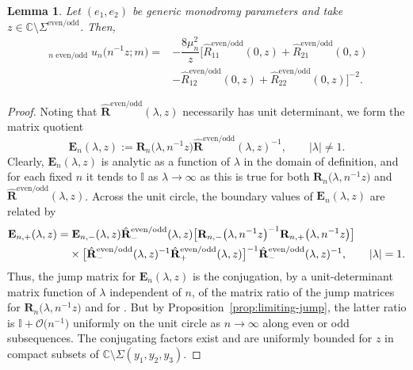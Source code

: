 \documentclass[pdftex]{sigma}
\numberwithin{equation}{section}
\newtheorem{Lemma}[Theorem]{Lemma}
\newcommand{\C}{{\mathbb{C}}}
\begin{document}
\begin{Lemma}
\label{lemma:limit}
Let $(e_1, e_2)$ be generic monodromy parameters and take $z \in \C \setminus \Sigma^\mathrm{even/odd}$. Then,
\begin{align}
 \mathop{\lim_{n\to\infty}}_{\text{$n$ even/odd}}u_n\big(n^{-1}z;m\big)={}&-\dfrac{8 \mu_n^2}{z}\big[\hat{R}_{11}^\mathrm{even/odd}(0,z)+\hat{R}_{21}^\mathrm{even/odd}(0,z)\nonumber\\
 &-\hat{R}_{12}^\mathrm{even/odd}(0,z)+\hat{R}_{22}^\mathrm{even/odd}(0,z)\big]^{-2}.\label{eq:un-Rhat}
\end{align}
\end{Lemma}
\begin{proof}

Noting that $\hat{\mathbf{R}}^\mathrm{even/odd}(\lambda,z)$ necessarily has unit determinant, we form the matrix quotient
\begin{equation*}
 \mathbf{E}_n(\lambda,z):=\mathbf{R}_n\big(\lambda,n^{-1}z\big)\hat{\mathbf{R}}^\mathrm{even/odd}(\lambda,z)^{-1},\qquad |\lambda|\neq 1.
\end{equation*}
Clearly, $\mathbf{E}_n(\lambda,z)$ is analytic as a function of $\lambda$ in the domain of definition, and for each fixed $n$ it tends to $\mathbb{I}$ as $\lambda\to\infty$ as this is true for both $\mathbf{R}_n\big(\lambda,n^{-1}z\big)$ and $\hat{\mathbf{R}}^\mathrm{even/odd}(\lambda,z)$. Across the unit circle, the boundary values of $\mathbf{E}_n(\lambda,z)$ are related by
\begin{align*}
 &\mathbf{E}_{n,+}(\lambda,z)= \mathbf{E}_{n,-}(\lambda,z)\hat{\mathbf{R}}_-^\mathrm{even/odd}(\lambda,z)\big[\mathbf{R}_{n,-}\big(\lambda,n^{-1}z\big)^{-1}\mathbf{R}_{n,+}\big(\lambda,n^{-1}z\big)\big]\\
 &\hphantom{\mathbf{E}_{n,+}(\lambda,z)=}{}
 \times \big[\hat{\mathbf{R}}^\mathrm{even/odd}_-(\lambda,z)^{-1}\hat{\mathbf{R}}^\mathrm{even/odd}_+(\lambda,z)\big]^{-1}
 \hat{\mathbf{R}}^\mathrm{even/odd}_-(\lambda,z)^{-1},\qquad |\lambda|=1.
\end{align*}
Thus, the jump matrix for $\mathbf{E}_n(\lambda,z)$ is the conjugation, by a unit-determinant matrix function of $\lambda$ independent of $n$, of the matrix ratio of the jump matrices for $\mathbf{R}_n\big(\lambda,n^{-1}z\big)$ and for . But by Proposition~\ref{prop:limiting-jump}, the latter ratio is $\mathbb{I}+\mathcal{O}\big(n^{-1}\big)$ uniformly on the unit circle as $n\to\infty$ along even or odd subsequences. The conjugating factors exist and are uniformly bounded for $z$ in compact subsets of $\C\setminus \Sigma(y_1, y_2, y_3)$. %

\end{proof}
\end{document}

